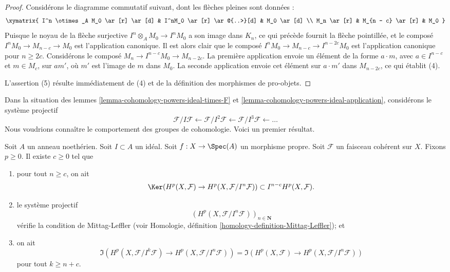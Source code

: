 \begin{proof}
\medskip\noindent
Considérons le diagramme commutatif suivant, dont les flèches pleines sont données :
$$
\xymatrix{
I^n \otimes_A M_0 \ar[r] \ar[d] &
I^nM_0 \ar[r] \ar@{..>}[d] &
M_0 \ar[d] \\
M_n \ar[r] &
M_{n - c} \ar[r] &
M_0
}
$$
Puisque le noyau de la flèche surjective $I^n \otimes_A M_0 \to I^nM_0$
a son image dans $K_n$, ce qui précède fournit la flèche pointillée, et le
composé $I^nM_0 \to M_{n - c} \to M_0$ est l'application canonique. Il est
alors clair que le composé $I^nM_0 \to M_{n - c} \to I^{n - 2c}M_0$
est l'application canonique pour $n \geq 2c$. Considérons le composé
$M_n \to I^{n - c}M_0 \to M_{n - 2c}$. La première application
envoie un élément de la forme $a \cdot m$,
avec $a \in I^{n - c}$ et $m \in M_c$,
sur $a m'$, où $m'$ est l'image de $m$ dans $M_0$.
La seconde application envoie cet élément sur $a \cdot m'$ dans $M_{n - 2c}$,
ce qui établit (4).

\medskip\noindent
L'assertion (5) résulte immédiatement de (4) et de la définition des
morphismes de pro-objets.
\end{proof}

\noindent
Dans la situation des lemmes \ref{lemma-cohomology-powers-ideal-times-F} et
\ref{lemma-cohomology-powers-ideal-application}, considérons le système
projectif
$$
\mathcal{F}/I\mathcal{F} \leftarrow
\mathcal{F}/I^2\mathcal{F} \leftarrow
\mathcal{F}/I^3\mathcal{F} \leftarrow \ldots
$$
Nous voudrions connaître le comportement des groupes de cohomologie.
Voici un premier résultat.

\begin{lemma}
\label{lemma-ML-cohomology-powers-ideal}
Soit $A$ un anneau noethérien.
Soit $I \subset A$ un idéal.
Soit $f : X \to \Spec(A)$ un morphisme propre.
Soit $\mathcal{F}$ un faisceau cohérent sur $X$.
Fixons $p \geq 0$. Il existe $c \geq 0$ tel que
\begin{enumerate}
\item pour tout $n \geq c$, on ait
$$
\Ker(H^p(X, \mathcal{F}) \to H^p(X, \mathcal{F}/I^n\mathcal{F})) \subset
I^{n - c}H^p(X, \mathcal{F}).
$$
\item le système projectif
$$
\left(H^p(X, \mathcal{F}/I^n\mathcal{F})\right)_{n \in \mathbf{N}}
$$
vérifie la condition de Mittag-Leffler (voir
Homologie, définition \ref{homology-definition-Mittag-Leffler}); et
\item on ait
$$
\Im(H^p(X, \mathcal{F}/I^k\mathcal{F})
\to H^p(X, \mathcal{F}/I^n\mathcal{F}))
=
\Im(H^p(X, \mathcal{F})
\to H^p(X, \mathcal{F}/I^n\mathcal{F}))
$$
pour tout $k \geq n + c$.
\end{enumerate}
\end{lemma}

